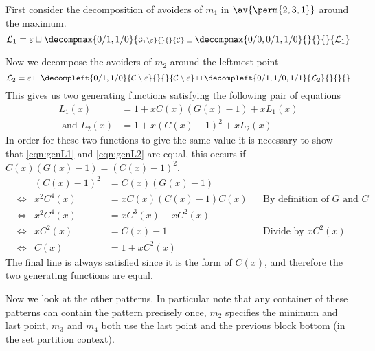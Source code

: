 First consider the decomposition of avoiders of \(m_1\) in \(\av{\perm{2,3,1}}\)
around the maximum.
\begin{equation*}
    \mathcal{L}_1 =
    \varepsilon \sqcup
    \decompmax{0/1,1/0}{\scriptstyle \mathcal{G}_1\setminus\varepsilon}{}{}{\mathcal{C}}
    \sqcup
    \decompmax{0/0,0/1,1/0}{}{}{}{\mathcal{L}_1}
\end{equation*}

Now we decompose the avoiders of \(m_2\) around the leftmost point
\begin{equation*}
    \mathcal{L}_2 =
    \varepsilon \sqcup
    \decompleft{0/1,1/0}{\mathcal{C}\setminus\varepsilon}{}{}{\mathcal{C}\setminus\varepsilon}
    \sqcup
    \decompleft{0/1,1/0,1/1}{\mathcal{L}_2}{}{}{}
\end{equation*}
This gives us two generating functions satisfying the following pair of equations
\begin{align}
    L_1(x) &= 1 + xC(x)(G(x)-1) +xL_1(x) \label{eqn:genL1}\\
    \text{ and }L_2(x) &= 1 + x(C(x)-1)^2 + xL_2(x) \label{eqn:genL2}
\end{align}
In order for these two functions to give the same value it is necessary to show that
\eqref{eqn:genL1} and \eqref{eqn:genL2} are equal, this occurs if
\(C(x)(G(x)-1) = (C(x)-1)^2\).
\begin{align*}
    &&(C(x)-1)^2 &= C(x)(G(x)-1)\\
        &\Leftrightarrow& x^2C^4(x) &=  xC(x)(C(x)-1)C(x) &&\text{By definition of \(G\) and \(C\)}\\
        &\Leftrightarrow& x^2C^4(x)&=xC^3(x)-xC^2(x)\\
        &\Leftrightarrow& xC^2(x) &= C(x) -1 &&\text{Divide by \(xC^2(x)\)}\\
        &\Leftrightarrow& C(x) &= 1 +xC^2(x)
\end{align*}
The final line is always satisfied since it is the form of \(C(x)\), and
therefore the two generating functions are equal.

Now we look at the other patterns. In particular note that any container of these
patterns can contain the pattern precisely once, \(m_2\) specifies the
minimum and last point, \(m_3\) and \(m_4\) both use the last point and the
previous block bottom (in the set partition context).

